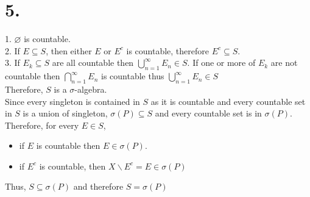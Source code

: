 \documentclass[11pt]{article}
\theoremstyle{mystyle}
\theoremstyle{definition}
\begin{document}
\newpage
\section*{5.}
1. $\varnothing$ is countable. \\
2. If $E \subseteq S$, then either $E$ or $E^c$ is countable, therefore $E^c \subseteq S$. \\
3. If $E_k \subseteq S$ are all countable then $\bigcup_{n=1}^\infty E_n \in S$. If one or more of $E_k$ are not countable then $\bigcap_{n=1}^\infty E_n$ is countable thus $\bigcup_{n=1}^\infty E_n \in S$ \\
Therefore, $S$ is a $\sigma$-algebra. \\
Since every singleton is contained in $S$ as it is countable and every countable set in $S$ is a union of singleton, $\sigma(P) \subseteq S$ and every countable set is in $\sigma(P)$. \\
Therefore, for every $E \in S$, 
\begin{itemize}
  \item if $E$ is countable then $E \in \sigma(P)$. 
  \item if $E^c$ is countable, then $X \backslash E^c = E \in \sigma(P)$
\end{itemize}
Thus, $S \subseteq \sigma(P)$ and therefore $S = \sigma(P)$
\end{document}
